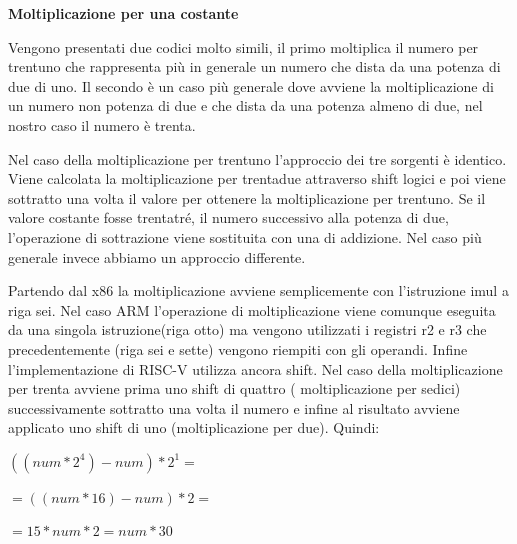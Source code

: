 \documentclass[12pt, a4paper]{report}
\begin{document}
\vspace{0.3 cm}

\textbf{Moltiplicazione per una costante}

Vengono presentati due codici molto simili, il primo moltiplica il numero per trentuno che rappresenta più in generale un numero che dista da una potenza di due di uno. Il secondo è un caso più generale dove avviene la moltiplicazione di un numero non potenza di due e che dista da una potenza almeno di due, nel nostro caso il numero è trenta.

\vspace{0.2 cm }

\begin{figure}[ht]
	\begin{subfigure}[b]{0.4\textwidth}
 
 	
		
 \end{subfigure}
 \hfill
 \begin{subfigure}[b]{0.4\textwidth}
 
 	
		
 \end{subfigure}
 
\end{figure}

\vspace{0.3 cm}

Nel caso della moltiplicazione per trentuno l'approccio dei tre sorgenti è identico. Viene calcolata la moltiplicazione per trentadue attraverso shift logici e poi viene sottratto una volta il valore per ottenere la moltiplicazione per trentuno. Se il valore costante fosse trentatré, il numero successivo alla potenza di due, l'operazione di sottrazione viene sostituita con una di addizione. Nel caso più generale invece abbiamo un approccio differente.

Partendo dal x86 la moltiplicazione avviene semplicemente con l'istruzione imul a riga sei. Nel caso ARM l'operazione di moltiplicazione viene comunque eseguita da una singola istruzione(riga otto) ma vengono utilizzati i registri r2 e r3 che precedentemente (riga sei e sette) vengono riempiti con gli operandi. Infine l'implementazione di RISC-V utilizza ancora shift. Nel caso della moltiplicazione per trenta avviene prima uno shift di quattro ( moltiplicazione per sedici) successivamente sottratto una volta il numero e infine al risultato avviene applicato uno shift di uno (moltiplicazione per due). Quindi: 
\begin{center}
	\vspace{0.2cm}
$((num * 2^4) - num ) * 2^1 = $ 

$ =((num * 16 ) - num ) * 2 =$ 

$ = 15 * num * 2 = num *30 $ 
\end{center}
\end{document}
